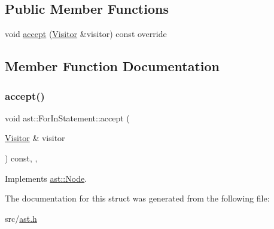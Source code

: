 \subsection*{Public Member Functions}
\begin{DoxyCompactItemize}
\item 
void \hyperlink{structast_1_1_for_in_statement_a9322c609ad608ac86f4afb4170d6ffff}{accept} (\hyperlink{structast_1_1_visitor}{Visitor} \&visitor) const override
\end{DoxyCompactItemize}


\subsection{Member Function Documentation}
\mbox{\label{structast_1_1_for_in_statement_a9322c609ad608ac86f4afb4170d6ffff}} 
\subsubsection{\texorpdfstring{accept()}{accept()}}
{\footnotesize\ttfamily void ast\+::\+For\+In\+Statement\+::accept (\begin{DoxyParamCaption}\item[{\hyperlink{structast_1_1_visitor}{Visitor} \&}]{visitor }\end{DoxyParamCaption}) const\hspace{0.3cm}{\ttfamily [inline]}, {\ttfamily [override]}, {\ttfamily [virtual]}}



Implements \hyperlink{structast_1_1_node_abc089ee6caaf06a4445ebdd8391fdebc}{ast\+::\+Node}.



The documentation for this struct was generated from the following file\+:\begin{DoxyCompactItemize}
\item 
src/\hyperlink{ast_8h}{ast.\+h}\end{DoxyCompactItemize}
